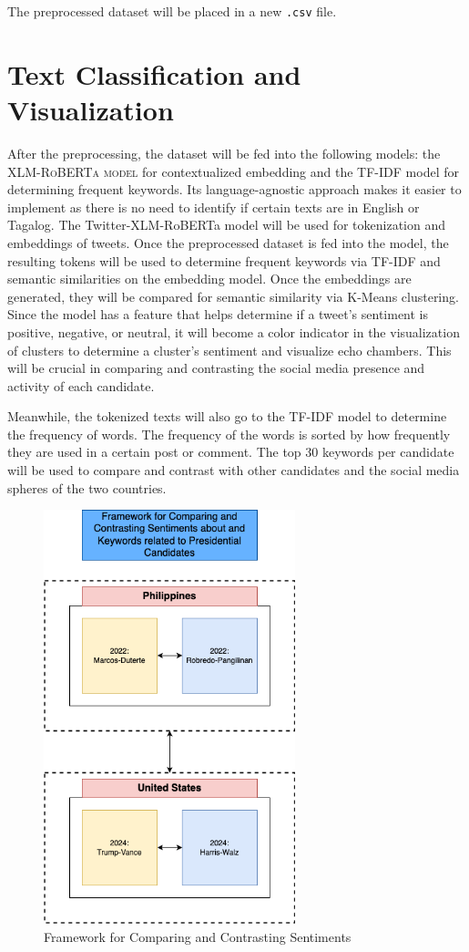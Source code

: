 The preprocessed dataset will be placed in a new \texttt{.csv} file.

\section{Text Classification and Visualization}
After the preprocessing, the dataset will be fed into the following models: the \textsc{XLM-RoBERTa model} for contextualized embedding and the TF-IDF model for determining frequent keywords. Its language-agnostic approach makes it easier to implement as there is no need to identify if certain texts are in English or Tagalog. The Twitter-XLM-RoBERTa model will be used for tokenization and embeddings of tweets. Once the preprocessed dataset is fed into the model, the resulting tokens will be used to determine frequent keywords via TF-IDF and semantic similarities on the embedding model. Once the embeddings are generated, they will be compared for semantic similarity via K-Means clustering. Since the model has a feature that helps determine if a tweet’s sentiment is positive, negative, or neutral, it will become a color indicator in the visualization of clusters to determine a cluster’s sentiment and visualize echo chambers. This will be crucial in comparing and contrasting the social media presence and activity of each candidate.

Meanwhile, the tokenized texts will also go to the TF-IDF model to determine the frequency of words. The frequency of the words is sorted by how frequently they are used in a certain post or comment. The top 30 keywords per candidate will be used to compare and contrast with other candidates and the social media spheres of the two countries.\newline

\begin{figure}[h]
    \centering
    \includegraphics[width=0.65\textwidth]{Figures/methodology_framework-for-comparing.png}
    \caption{Framework for Comparing and Contrasting Sentiments}
    \label{fig:Framework-for-sentiments}
\end{figure}